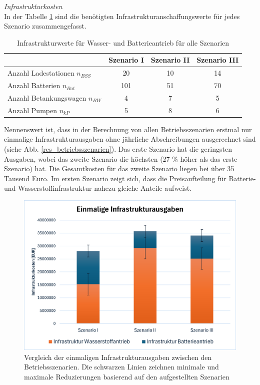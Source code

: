 \textit{Infrastrukturkosten}\\
In der Tabelle \ref{Infrastrukturwerte_res} sind die benötigten 
Infrastrukturanschaffungswerte für jedes Szenario zusammengefasst. 
%
\begin{table}[h]
	\begin{center}
    \caption{Infrastrukturwerte für Wasser- und Batterieantrieb für alle Szenarien}
	\label{Infrastrukturwerte_res}
	\begin{tabular}{|l|c|c|c|}
		\hline
		 & \textbf{Szenario I}& \textbf{Szenario II}& \textbf{Szenario III} \\ \hline
		Anzahl Ladestationen $n_{BSS}$ & 20 & 10& 14\\ \hline
		Anzahl Batterien $n_{Bat}$ & 101 & 51& 70 \\ \hline
		Anzahl Betankungswagen $n_{BW}$ & 4 & 7 & 5\\ \hline
		Anzahl Pumpen $n_{kP}$  & 5 & 8 & 6\\ \hline
	\end{tabular}
    \end{center}
\end{table}
%
Nennenswert ist, dass in der Berechnung von allen Betriebsszenarien erstmal nur einmalige Infrastrukturausgaben 
ohne jährliche Abschreibungen ausgerechnet sind (siehe Abb. \ref{res_betriebsszenarien}). 
Das erste Szenario hat die geringsten Ausgaben, wobei das zweite Szenario die höchsten (27 \% höher als das erste Szenario) hat.
Die Gesamtkosten für das zweite Szenario liegen bei über 35 Tausend Euro. %
Im ersten Szenario zeigt sich, dass die Preisaufteilung für Batterie- und Wasserstoffinfrastruktur nahezu gleiche Anteile aufweist.
\begin{figure}[h]
	\centering
	\includegraphics[width=0.8\linewidth]{Bilder/Infr_Szenarien.png}
	\caption[Vergleich der einmaligen Infrastrukturausgaben zwischen den Betriebsszenarien]{Vergleich der einmaligen Infrastrukturausgaben zwischen den Betriebsszenarien. Die schwarzen Linien
	zeichnen minimale und maximale Reduzierungen basierend auf den aufgestellten Szenarien}
	\label{res_infr_betriebsszenarien}
\end{figure}
